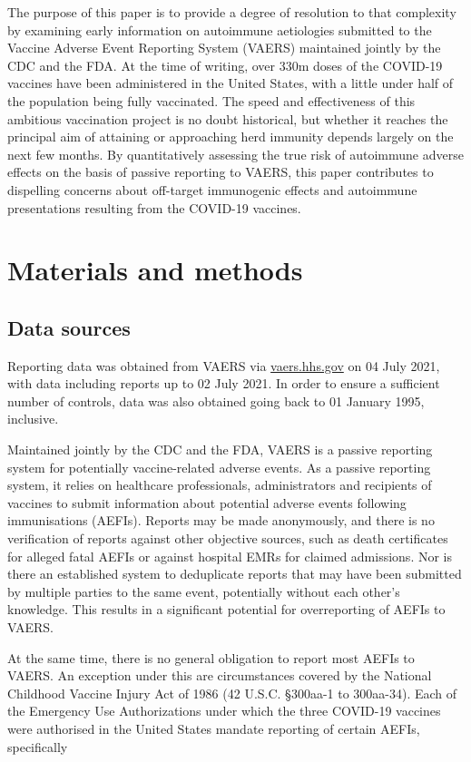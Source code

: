 \documentclass{article}
\begin{document}
The purpose of this paper is to provide a degree of resolution to that complexity by examining early information on autoimmune aetiologies submitted to the Vaccine Adverse Event Reporting System (VAERS) maintained jointly by the CDC and the FDA.
At the time of writing, over 330m doses of the COVID-19 vaccines have been administered in the United States, with a little under half of the population being fully vaccinated.
The speed and effectiveness of this ambitious vaccination project is no doubt historical, but whether it reaches the principal aim of attaining or approaching herd immunity depends largely on the next few months.
By quantitatively assessing the true risk of autoimmune adverse effects on the basis of passive reporting to VAERS, this paper contributes to dispelling concerns about off-target immunogenic effects and autoimmune presentations resulting from the COVID-19 vaccines.

\section{Materials and methods}

\subsection{Data sources}

Reporting data was obtained from VAERS via \url{vaers.hhs.gov} on 04 July 2021, with data including reports up to 02 July 2021.
In order to ensure a sufficient number of controls, data was also obtained going back to 01 January 1995, inclusive.

Maintained jointly by the CDC and the FDA, VAERS is a passive reporting system for potentially vaccine-related adverse events.\cite{chen1994vaccine}
As a passive reporting system, it relies on healthcare professionals, administrators and recipients of vaccines to submit information about potential adverse events following immunisations (AEFIs).
Reports may be made anonymously, and there is no verification of reports against other objective sources, such as death certificates for alleged fatal AEFIs or against hospital EMRs for claimed admissions.
Nor is there an established system to deduplicate reports that may have been submitted by multiple parties to the same event, potentially without each other's knowledge.\cite{von2021vaers}
This results in a significant potential for overreporting of AEFIs to VAERS.

At the same time, there is no general obligation to report most AEFIs to VAERS.
An exception under this are circumstances covered by the National Childhood Vaccine Injury Act of 1986 (42 U.S.C. \S 300aa-1 to 300aa-34).
Each of the Emergency Use Authorizations under which the three COVID-19 vaccines were authorised in the United States mandate reporting of certain AEFIs, specifically
\end{document}

